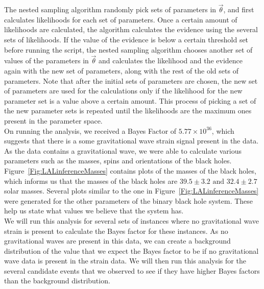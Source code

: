 \documentclass{article}
\begin{document}
 The nested sampling algorithm randomly pick sets of parameters in $\vec{\theta}$, and first calculates likelihoods for each set of parameters. Once a certain amount of likelihoods are calculated, the algorithm calculates the evidence using the several sets of likelihoods. If the value of the evidence is below a certain threshold set before running the script, the nested sampling algorithm chooses another set of values of the parameters in $\vec{\theta}$ and calculates the likelihood and the evidence again with the new set of parameters, along with the rest of the old sets of parameters. Note that after the initial sets of parameters are chosen, the new set of parameters are used for the calculations only if the likelihood for the new parameter set is a value above a certain amount. This process of picking a set of the new parameter sets is repeated until the likelihoods are the maximum ones present in the parameter space.\\
 
 
  On running the analysis, we received a Bayes Factor of $5.77\times 10^{36}$, which suggests that there is a some gravitational wave strain signal present in the data.\\
 
   
      
      
 As the data contains a gravitational wave, we were able to calculate various parameters such as the masses, spins and orientations of the black holes. Figure~\ref{Fig:LALinferenceMasses} contains plots of the masses of the black holes, which informs us that the masses of the black holes are $39.5\pm3.2 \text{ and } 32.4\pm2.7$ solar masses. Several plots similar to the one in Figure~\ref{Fig:LALinferenceMasses} were generated for the other parameters of the binary black hole system. These help us state what values we believe that the system has. \\
 
 We will run this analysis for several sets of instances where no gravitational wave strain is present to calculate the Bayes factor for these instances. As no gravitational waves are present in this data, we can create a background distribution of the value that we expect the Bayes factor to be if no gravitational wave data is present in the strain data. We will then run this analysis for the several candidate events that we observed to see if they have higher Bayes factors than the background distribution. 
 
\end{document}
